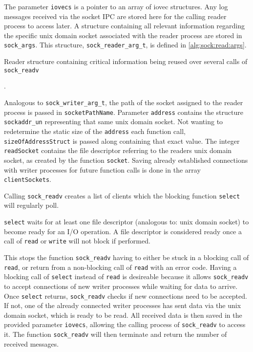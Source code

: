 The parameter \texttt{iovecs} is a pointer to an array of iovec structures.
Any log messages received via the socket \ac{IPC} are stored here for the calling reader process to access later.
A structure containing all relevant information regarding the specific unix domain socket associated with the reader process are stored in \texttt{sock\_args}.
This structure, \texttt{sock\_reader\_arg\_t}, is defined in \ref{alg:sock:read:args}.

\begin{algorithm}[h!]
    
    \caption[Socket: Reader structure]{Reader structure containing critical information being reused over several calls of \texttt{sock\_readv}}.
    \label{alg:sock:read:args}
\end{algorithm}

Analogous to \texttt{sock\_writer\_arg\_t}, the path of the socket assigned to the reader process is passed in \texttt{socketPathName}.
Parameter \texttt{address} contains the structure \texttt{sockaddr\_un} representing that same unix domain socket.
Not wanting to redetermine the static size of the \texttt{address} each function call, \texttt{sizeOfAddressStruct} is passed along containing that exact value.
The integer \texttt{readSocket} contains the file descriptor referring to the readers unix domain socket, as created by the function \texttt{socket}.
Saving already established connections with writer processes for future function calls is done in the array \texttt{clientSockets}.

Calling \texttt{sock\_readv} creates a list of clients which the blocking function \texttt{select} will regularly poll.

\texttt{select} waits for at least one file descriptor (analogous to: unix domain socket) to become ready for an I/O operation.
A file descriptor is considered ready once a call of \texttt{read} or \texttt{write} will not block if performed.\cite{man:select}

This stops the function \texttt{sock\_readv} having to either be stuck in a blocking call of \texttt{read}, or return from a non-blocking call of \texttt{read} with an error code.
Having a blocking call of \texttt{select} instead of \texttt{read} is desireable because it allows \texttt{sock\_readv} to accept connections of new writer processes while waiting for data to arrive.
Once \texttt{select} returns, \texttt{sock\_readv} checks if new connections need to be accepted.
If not, one of the already connected writer processes has sent data via the unix domain socket, which is ready to be read.
All received data is then saved in the provided parameter \texttt{iovecs}, allowing the calling process of \texttt{sock\_readv} to access it.
The function \texttt{sock\_readv} will then terminate and return the number of received messages.
